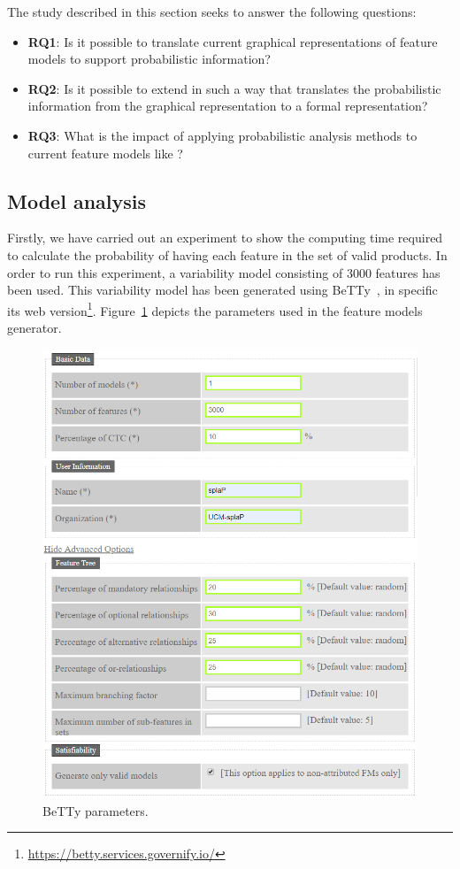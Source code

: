 The study described in this section seeks to answer the following questions:

\begin{itemize}
        \item \textbf{RQ1}: Is it possible to translate current graphical representations of feature models to
        support probabilistic information?
        \item \textbf{RQ2}: Is it possible to extend \fodaPA in such a way that
        translates the probabilistic information from the graphical representation to a formal representation?
        \item \textbf{RQ3}: What is the impact of applying probabilistic analysis methods to current feature models like \FODA?
\end{itemize}




\subsection{Model analysis}
\label{sec:stat:impl:model:analysis}

Firstly, we have carried out an experiment to
show the computing time required to calculate the probability of having
each feature in the set of valid products.
In order to run this experiment, a variability model consisting of
3000 features has been used.
This variability model
has been generated using BeTTy~\cite{sg12}, in specific
its web version\footnote{\url{https://betty.services.governify.io/}}.
Figure~\ref{fig:plot:betty:params} depicts the parameters used in the feature models
generator.

\begin{figure}[h]
        \centering
        \linefigure
        \includegraphics[width=0.8\hsize,angle=0]{BeTTy_website2.png}
        \linefigure
        \caption{BeTTy parameters.}\label{fig:plot:betty:params}
\end{figure}


